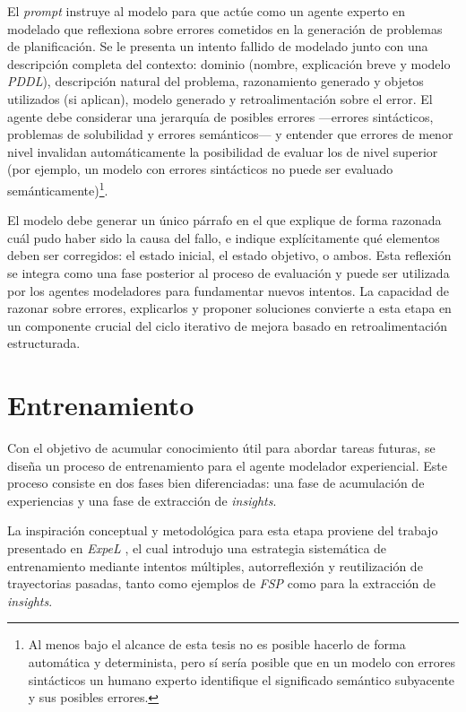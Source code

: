 El \textit{prompt} instruye al modelo para que actúe como un agente experto en modelado que reflexiona sobre errores cometidos en la generación de problemas de planificación. Se le presenta un intento fallido de modelado junto con una descripción completa del contexto: dominio (nombre, explicación breve y modelo \textit{PDDL}), descripción natural del problema, razonamiento generado y objetos utilizados (si aplican), modelo generado y retroalimentación sobre el error. El agente debe considerar una jerarquía de posibles errores —errores sintácticos, problemas de solubilidad y errores semánticos— y entender que errores de menor nivel invalidan automáticamente la posibilidad de evaluar los de nivel superior (por ejemplo, un modelo con errores sintácticos no puede ser evaluado semánticamente)\footnote{Al menos bajo el alcance de esta tesis no es posible hacerlo de forma automática y determinista, pero sí sería posible que en un modelo con errores sintácticos un humano experto identifique el significado semántico subyacente y sus posibles errores.}.

El modelo debe generar un único párrafo en el que explique de forma razonada cuál pudo haber sido la causa del fallo, e indique explícitamente qué elementos deben ser corregidos: el estado inicial, el estado objetivo, o ambos. Esta reflexión se integra como una fase posterior al proceso de evaluación y puede ser utilizada por los agentes modeladores para fundamentar nuevos intentos. La capacidad de razonar sobre errores, explicarlos y proponer soluciones convierte a esta etapa en un componente crucial del ciclo iterativo de mejora basado en retroalimentación estructurada.

\section{Entrenamiento}

Con el objetivo de acumular conocimiento útil para abordar tareas futuras, se diseña un proceso de entrenamiento para el agente modelador experiencial. Este proceso consiste en dos fases bien diferenciadas: una fase de acumulación de experiencias y una fase de extracción de \textit{insights}.

La inspiración conceptual y metodológica para esta etapa proviene del trabajo presentado en \textit{ExpeL} \parencite{zhao2024expel}, el cual introdujo una estrategia sistemática de entrenamiento mediante intentos múltiples, autorreflexión y reutilización de trayectorias pasadas, tanto como ejemplos de \textit{FSP} como para la extracción de \textit{insights}.

